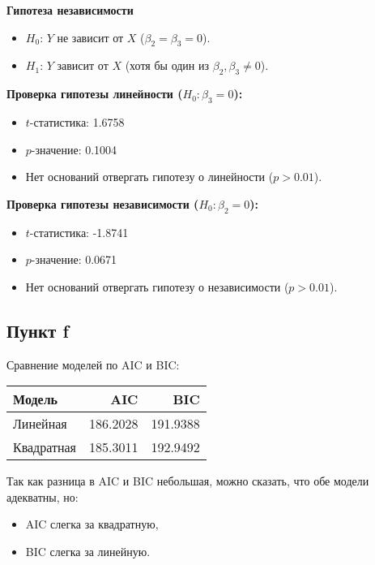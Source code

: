 \documentclass[12pt]{spbstu-task}
\begin{document}
\textbf{Гипотеза независимости}
\begin{itemize}
\item \(H_0\): \(Y\) не зависит от \(X\) (\(\beta_2 = \beta_3 = 0\)).
\item \(H_1\): \(Y\) зависит от \(X\) (хотя бы один из \(\beta_2, \beta_3
  \neq 0\)).
\end{itemize}

\textbf{Проверка гипотезы линейности (\(H_0: \beta_3 = 0\)):}
\begin{itemize}
\item \(t\)-статистика: 1.6758
\item \(p\)-значение:
0.1004
\item Нет оснований отвергать гипотезу о линейности (\(p > 0.01\)).
\end{itemize}

\textbf{Проверка гипотезы независимости (\(H_0: \beta_2 = 0\)):}
\begin{itemize}
\item \(t\)-статистика: -1.8741
\item \(p\)-значение: 0.0671
\item Нет оснований отвергать гипотезу о независимости (\(p > 0.01\)).
\end{itemize}
\subsection{Пункт f}
\label{sec:orgb3cb446}
Сравнение моделей по AIC и BIC:
\begin{table}[H]
  \centering
  \begin{tabular}{lrr} \toprule
    Модель & AIC & BIC \\ \midrule
    Линейная & 186.2028 & 191.9388 \\
    Квадратная & 185.3011 & 192.9492 \\ \bottomrule
  \end{tabular}
\end{table}

Так как разница в AIC и BIC небольшая, можно сказать, что обе модели
адекватны, но:
\begin{itemize}
\item AIC слегка за квадратную,
\item BIC слегка за линейную.
\end{itemize}
\end{document}
